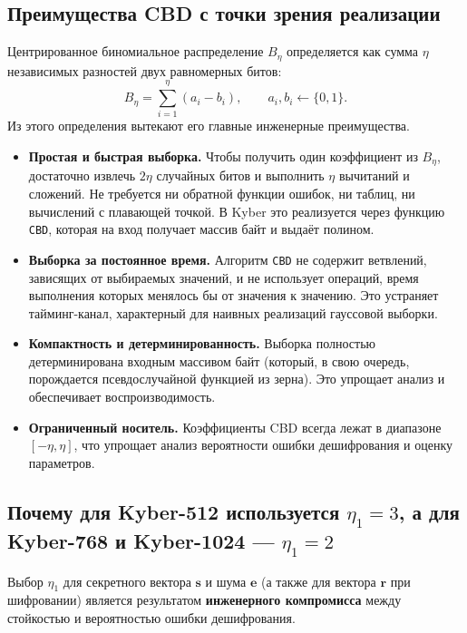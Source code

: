 \documentclass[11pt,a4paper]{article}
\begin{document}
\subsection{Преимущества CBD с точки зрения реализации}

Центрированное биномиальное распределение \(B_\eta\) определяется как сумма \(\eta\) независимых разностей двух равномерных битов:
\[
    B_\eta = \sum_{i=1}^{\eta} (a_i - b_i), \qquad a_i,b_i \leftarrow \{0,1\}.
\]
Из этого определения вытекают его главные инженерные преимущества.

\begin{itemize}
    \item \textbf{Простая и быстрая выборка.} Чтобы получить один коэффициент из \(B_\eta\), достаточно извлечь \(2\eta\) случайных битов и выполнить \(\eta\) вычитаний и сложений. Не требуется ни обратной функции ошибок, ни таблиц, ни вычислений с плавающей точкой. В Kyber это реализуется через функцию \texttt{CBD}, которая на вход получает массив байт и выдаёт полином.

    \item \textbf{Выборка за постоянное время.} Алгоритм \texttt{CBD} не содержит ветвлений, зависящих от выбираемых значений, и не использует операций, время выполнения которых менялось бы от значения к значению. Это устраняет тайминг-канал, характерный для наивных реализаций гауссовой выборки.

    \item \textbf{Компактность и детерминированность.} Выборка полностью детерминирована входным массивом байт (который, в свою очередь, порождается псевдослучайной функцией из зерна). Это упрощает анализ и обеспечивает воспроизводимость.

    \item \textbf{Ограниченный носитель.} Коэффициенты CBD всегда лежат в диапазоне \([-\eta,\eta]\), что упрощает анализ вероятности ошибки дешифрования и оценку параметров.
\end{itemize}

\subsection{Почему для Kyber-512 используется \(\eta_1=3\), а для Kyber-768 и Kyber-1024 — \(\eta_1=2\)}

Выбор \(\eta_1\) для секретного вектора \(\mathbf{s}\) и шума \(\mathbf{e}\) (а также для вектора \(\mathbf{r}\) при шифровании) является результатом \textbf{инженерного компромисса} между стойкостью и вероятностью ошибки дешифрования.
\end{document}
